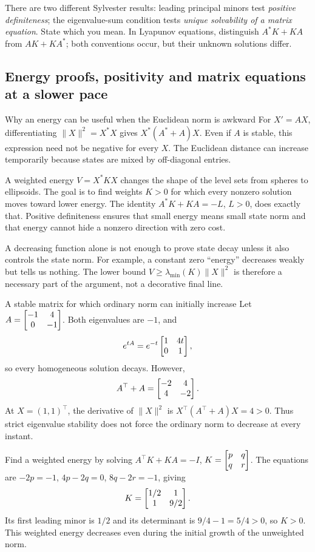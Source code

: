 \begin{tip}
There are two different Sylvester results: leading principal minors test \emph{positive definiteness}; the eigenvalue-sum condition tests \emph{unique solvability of a matrix equation}. State which you mean. In Lyapunov equations, distinguish $A^*K+KA$ from $AK+KA^*$; both conventions occur, but their unknown solutions differ.
\end{tip}

\subsection{Energy proofs, positivity and matrix equations at a slower pace}
\begin{concept}{Why an energy can be useful when the Euclidean norm is awkward}
For $X'=AX$, differentiating $\|X\|^2=X^*X$ gives $X^*(A^*+A)X$. Even if $A$ is stable, this expression need not be negative for every $X$. The Euclidean distance can increase temporarily because states are mixed by off-diagonal entries.

A weighted energy $V=X^*KX$ changes the shape of the level sets from spheres to ellipsoids. The goal is to find weights $K>0$ for which every nonzero solution moves toward lower energy. The identity $A^*K+KA=-L$, $L>0$, does exactly that. Positive definiteness ensures that small energy means small state norm and that energy cannot hide a nonzero direction with zero cost.

A decreasing function alone is not enough to prove state decay unless it also controls the state norm. For example, a constant zero ``energy'' decreases weakly but tells us nothing. The lower bound $V\geq\lambda_{\min}(K)\|X\|^2$ is therefore a necessary part of the argument, not a decorative final line.
\end{concept}
\begin{worked}{A stable matrix for which ordinary norm can initially increase}
Let $A=\begin{bmatrix}-1&4\\0&-1\end{bmatrix}$. Both eigenvalues are $-1$, and
\[e^{tA}=e^{-t}\begin{bmatrix}1&4t\\0&1\end{bmatrix},\]
so every homogeneous solution decays. However,
\[A^{\top}+A=\begin{bmatrix}-2&4\\4&-2\end{bmatrix}.\]
At $X=(1,1)^{\top}$, the derivative of $\|X\|^2$ is $X^{\top}(A^{\top}+A)X=4>0$. Thus strict eigenvalue stability does not force the ordinary norm to decrease at every instant.

Find a weighted energy by solving $A^{\top}K+KA=-I$, $K=\begin{bmatrix}p&q\\q&r\end{bmatrix}$. The equations are $-2p=-1$, $4p-2q=0$, $8q-2r=-1$, giving
\[K=\begin{bmatrix}1/2&1\\1&9/2\end{bmatrix}.\]
Its first leading minor is $1/2$ and its determinant is $9/4-1=5/4>0$, so $K>0$. This weighted energy decreases even during the initial growth of the unweighted norm.
\end{worked}
